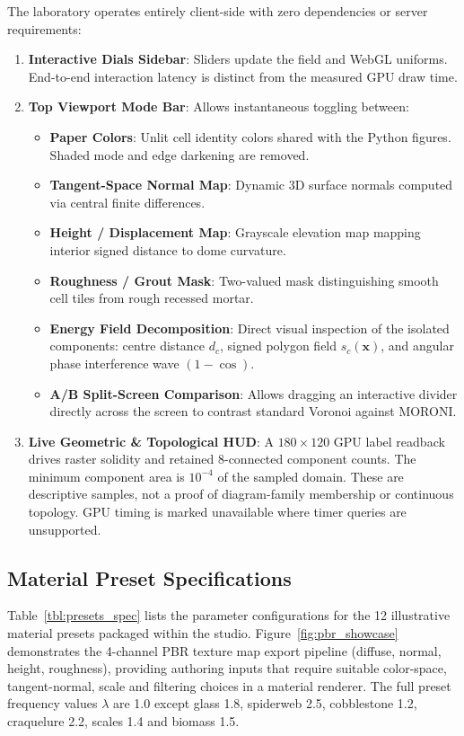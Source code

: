 \documentclass[sigconf,nonacm]{acmart}
\begin{document}
The laboratory operates entirely client-side with zero dependencies or server
requirements:
\begin{enumerate}
\item \textbf{Interactive Dials Sidebar}: Sliders update the field and WebGL uniforms.
End-to-end interaction latency is distinct from the measured GPU draw time.
\item \textbf{Top Viewport Mode Bar}: Allows instantaneous toggling between:
  \begin{itemize}
  \item \textbf{Paper Colors}: Unlit cell identity colors shared with the Python
  figures. Shaded mode and edge darkening are removed.
  \item \textbf{Tangent-Space Normal Map}: Dynamic 3D surface normals computed
  via central finite differences.
  \item \textbf{Height / Displacement Map}: Grayscale elevation map mapping
  interior signed distance to dome curvature.
  \item \textbf{Roughness / Grout Mask}: Two-valued mask distinguishing
  smooth cell tiles from rough recessed mortar.
  \item \textbf{Energy Field Decomposition}: Direct visual inspection of the
  isolated components: centre distance $d_c$, signed polygon field $s_c(\mathbf{x})$,
  and angular phase interference wave $(1-\cos)$.
  \item \textbf{A/B Split-Screen Comparison}: Allows dragging an interactive
  divider directly across the screen to contrast standard Voronoi against MORONI.
  \end{itemize}
\item \textbf{Live Geometric \& Topological HUD}: A $180\times120$ GPU label
readback drives raster solidity and retained 8-connected component counts.
The minimum component area is $10^{-4}$ of the sampled domain. These are
descriptive samples, not a proof of diagram-family membership or continuous
topology. GPU timing is marked unavailable where timer queries are unsupported.
\end{enumerate}

\subsection{Material Preset Specifications}

Table~\ref{tbl:presets_spec} lists the parameter configurations for the 12
illustrative material presets packaged within the studio. Figure~\ref{fig:pbr_showcase}
demonstrates the 4-channel PBR texture map export pipeline (diffuse, normal, height,
roughness), providing authoring inputs that require suitable color-space, tangent-normal,
scale and filtering choices in a material renderer. The full preset frequency
values $\lambda$ are 1.0 except glass 1.8, spiderweb 2.5, cobblestone 1.2,
craquelure 2.2, scales 1.4 and biomass 1.5.
\end{document}
